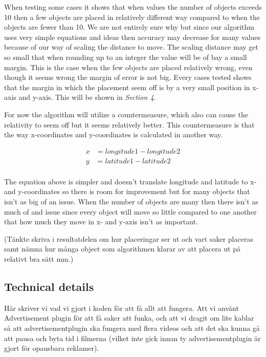 \documentclass[9pt,a4paper]{acmproc}
\begin{document}
When testing some cases it shows that when values the number of objects exceeds 10 then a few objects are placed in relatively different way compared to when the objects are fewer than 10. We are not entirely sure why but since our algorithm uses very simple equations and ideas then accuracy may decrease for many values because of our way of scaling the distance to move. The scaling distance may get so small that when rounding up to an integer the value will be of bay a small margin. This is the case when the few objects are placed relatively wrong, even though it seems wrong the margin of error is not big. Every cases tested shows that the margin in which the placement seem off is by a very small position in x-axis and y-axis. This will be shown in \textit{Section 4}.

For now the algorithm will utilize a countermeasure, which also can cause the relativity to seem off but it seems relatively better. This countermeasure is that the way x-coordinates and y-coordinates is calculated in another way.

\begin{align*}
x &= longitude1-longitude2  \\
y &= latitude1-latitude2 \\
\end{align*}

The equation above is simpler and doesn't translate longitude and latitude to x- and y-coordinates so there is room for improvement but for many objects that isn't as big of an issue. When the number of objects are many then there isn't as much of and issue since every object will move so little compared to one another that how much they move in x- and y-axis isn't as important. 

(Tänkte skriva i resultatdelen om hur placeringar ser ut och vart saker placeras samt nämna hur många object som algorithmen klarar av att placera ut på relativt bra sätt mm.)

\subsection{Technical details}
Här skriver vi vad vi gjort i koden för att få allt att fungera. Att vi använt Advertisement plugin för att få saker att funka, och att vi dragit om lite kablar så att advertisementplugin ska fungera med flera videos och att det ska kunna gå att pausa och byta tid i filmerna (vilket inte gick innan ty advertisementplugin är gjort för opausbara reklamer).
\end{document}
